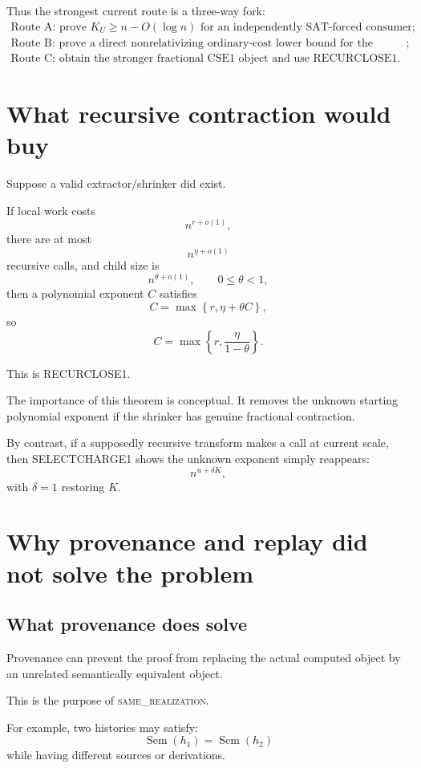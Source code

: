 \documentclass[11pt]{article}
\newcommand{\same}{\textsc{same\_realization}}
\theoremstyle{plain}
\theoremstyle{definition}
\theoremstyle{remark}
\begin{document}
Thus the strongest current route is a three-way fork:
\[
\boxed{
\begin{array}{l}
\text{Route A: prove }K_U\ge n-O(\log n)\text{ for an independently SAT-forced consumer};\\
\text{Route B: prove a direct nonrelativizing ordinary-cost lower bound for the wrapped process};\\
\text{Route C: obtain the stronger fractional CSE1 object and use RECURCLOSE1.}
\end{array}}
\]

\section{What recursive contraction would buy}

Suppose a valid extractor/shrinker did exist.

If local work costs
\[
n^{r+o(1)},
\]
there are at most
\[
n^{\eta+o(1)}
\]
recursive calls, and child size is
\[
n^{\theta+o(1)},
\qquad 0\le\theta<1,
\]
then a polynomial exponent \(C\) satisfies
\[
C
=
\max\left\{
r,\eta+\theta C
\right\},
\]
so
\[
\boxed{
C
=
\max\left\{
r,
\frac{\eta}{1-\theta}
\right\}.
}
\]

This is RECURCLOSE1.

The importance of this theorem is conceptual.  It removes the unknown starting
polynomial exponent if the shrinker has genuine fractional contraction.

By contrast, if a supposedly recursive transform makes a call at current
scale, then SELECTCHARGE1 shows the unknown exponent simply reappears:
\[
n^{u+\delta K},
\]
with \(\delta=1\) restoring \(K\).

\section{Why provenance and replay did not solve the problem}

\subsection{What provenance does solve}

Provenance can prevent the proof from replacing the actual computed object by
an unrelated semantically equivalent object.

This is the purpose of \same.

For example, two histories may satisfy:
\[
\operatorname{Sem}(h_1)
=
\operatorname{Sem}(h_2)
\]
while having different sources or derivations.
\end{document}
